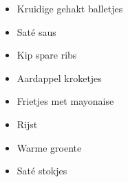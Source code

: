 \begin{itemize}
	\item	Kruidige gehakt balletjes
	\item	Saté saus
	\item	Kip spare ribs
	\item	Aardappel kroketjes
	\item	Frietjes met mayonaise
	\item	Rijst
	\item	Warme groente
	\item	Saté stokjes
\end{itemize}
